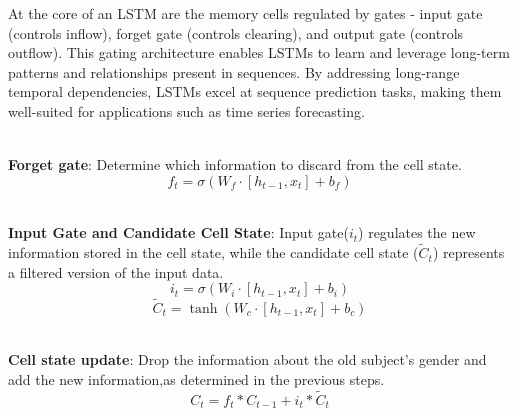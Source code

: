 \documentclass{ieeeojies}
\begin{document}
At the core of an LSTM are the memory cells regulated by gates - input gate (controls inflow), forget gate (controls clearing), and output gate (controls outflow). This gating architecture enables LSTMs to learn and leverage long-term patterns and relationships present in sequences. By addressing long-range temporal dependencies, LSTMs excel at sequence prediction tasks, making them well-suited for applications such as time series forecasting\cite{LSTM2}. 

\\\textbf{Forget gate}: Determine which information to discard from the cell state.
\begin{equation*}
f_t = \sigma(W_f \cdot [h_{t-1}, x_t] + b_f)
\end{equation*}

\\\textbf{Input Gate and Candidate Cell State}: Input gate($i_t$) regulates the new information stored in the cell state, while the candidate cell state ($\tilde{C}_t$) represents a filtered version of the input data.
\begin{equation*}
i_t = \sigma(W_i \cdot [h_{t-1}, x_t] + b_i)
\end{equation*}
\begin{equation*}
\tilde{C}_t = \tanh(W_c \cdot [h_{t-1}, x_t] + b_c) 
\end{equation*}

\\\textbf{Cell state update}: Drop the information about the old subject’s gender and add the new information,as determined in the previous steps.
\begin{equation*}
C_t = f_t \ast C_{t-1} + i_t \ast \tilde{C}_t
\end{equation*}
\end{document}
